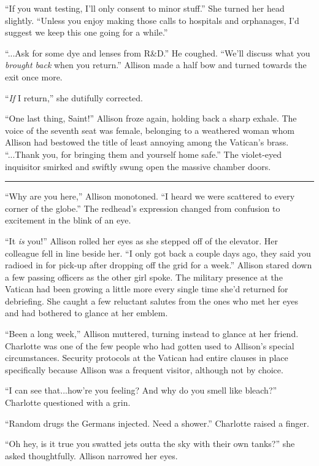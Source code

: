 \begin{Standard}
``If you want testing, I'll only consent to minor stuff.'' She turned her head slightly.
``Unless you enjoy making those calls to hospitals and orphanages, I'd suggest
we keep this one going for a while.''

``...Ask for some dye and lenses from R\&D.'' He coughed. ``We'll discuss what you
\emph{brought back} when you return.'' Allison made a half bow and turned towards the
exit once more.

``\emph{If} I return,'' she dutifully corrected.

``One last thing, Saint!'' Allison froze again, holding back a sharp exhale.
The voice of the seventh seat was female, belonging to a weathered woman whom
Allison had bestowed the title of least annoying among the Vatican's brass.
``...Thank you, for bringing them and yourself home safe.'' The violet-eyed
inquisitor smirked and swiftly swung open the massive chamber doors.

\fancybreak{* * *}

``Why are you here,'' Allison monotoned. ``I heard we were scattered to every corner
of the globe.'' The redhead's expression changed from confusion to excitement in the
blink of an eye.

``It \emph{is} you!'' Allison rolled her eyes as she stepped off of the elevator.
Her colleague fell in line beside her. ``I only got back a couple days ago,
they said you radioed in for pick-up after dropping off the grid for a week.''
Allison stared down a few passing officers as the other girl spoke. The military
presence at the Vatican had been growing a little more every single time she'd returned
for debriefing. She caught a few reluctant salutes from the ones who met her eyes
and had bothered to glance at her emblem.

``Been a long week,'' Allison muttered, turning instead to glance at her friend.
Charlotte was one of the few people who had gotten used to Allison's
special circumstances. Security protocols at the Vatican had entire clauses
in place specifically because Allison was a frequent visitor, although not by choice.

``I can see that...how're you feeling? And why do you smell like bleach?'' Charlotte
questioned with a grin.

``Random drugs the Germans injected. Need a shower.'' Charlotte raised a finger.

``Oh hey, is it true you swatted jets outta the sky with their own tanks?'' she
asked thoughtfully. Allison narrowed her eyes.


\end{Standard}
